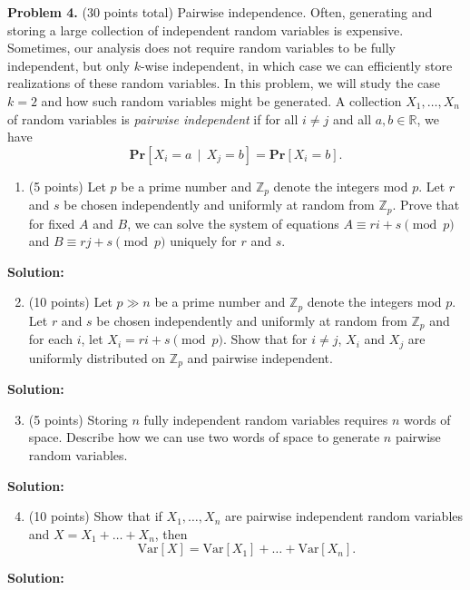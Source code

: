 \documentclass[11pt]{article}
\newcommand{\Var}[1]{\ensuremath{\text{Var}\left[#1\right]}}
\newcommand{\PPr}[1]{\ensuremath{\mathbf{Pr}\left[#1\right]}}
\begin{document}
\newpage\noindent
\textbf{Problem 4.} (30 points total)
Pairwise independence.
\vskip 0.1in\noindent
Often, generating and storing a large collection of independent random variables is expensive. Sometimes, our analysis does not require random variables to be fully independent, but only $k$-wise independent, in which case we can efficiently store realizations of these random variables. In this problem, we will study the case $k=2$ and how such random variables might be generated.
\vskip 0.1in\noindent
A collection $X_1,\ldots,X_n$ of random variables is \emph{pairwise independent} if for all $i\neq j$ and all $a,b\in\mathbb{R}$, we have
\[\PPr{X_i=a\,\mid\,X_j=b}=\PPr{X_i=b}.\]
\begin{enumerate}
\item (5 points)
Let $p$ be a prime number and $\mathbb{Z}_p$ denote the integers mod $p$. 
Let $r$ and $s$ be chosen independently and uniformly at random from $\mathbb{Z}_p$.  
Prove that for fixed $A$ and $B$, we can solve the system of equations $A\equiv ri+s\pmod{p}$ and $B\equiv rj+s\pmod{p}$ uniquely for $r$ and $s$. 
\end{enumerate}

\noindent\textbf{Solution:}












\begin{enumerate}
\setcounter{enumi}{1}
\item (10 points)
Let $p\gg n$ be a prime number and $\mathbb{Z}_p$ denote the integers mod $p$. 
Let $r$ and $s$ be chosen independently and uniformly at random from $\mathbb{Z}_p$ and for each $i$, let $X_i=ri+s\pmod{p}$. 
Show that for $i\neq j$, $X_i$ and $X_j$ are uniformly distributed on $\mathbb{Z}_p$ and pairwise independent. 
\end{enumerate}

\noindent\textbf{Solution:}












\begin{enumerate}
\setcounter{enumi}{2}
\item (5 points)
Storing $n$ fully independent random variables requires $n$ words of space. Describe how we can use two words of space to generate $n$ pairwise random variables. 
\end{enumerate}

\noindent\textbf{Solution:}











\begin{enumerate}
\setcounter{enumi}{3}
\item (10 points)
Show that if $X_1,\ldots,X_n$ are pairwise independent random variables and $X=X_1+\ldots+X_n$, then
\[\Var{X}=\Var{X_1}+\ldots+\Var{X_n}.\]
\end{enumerate}

\noindent\textbf{Solution:}
\end{document}
